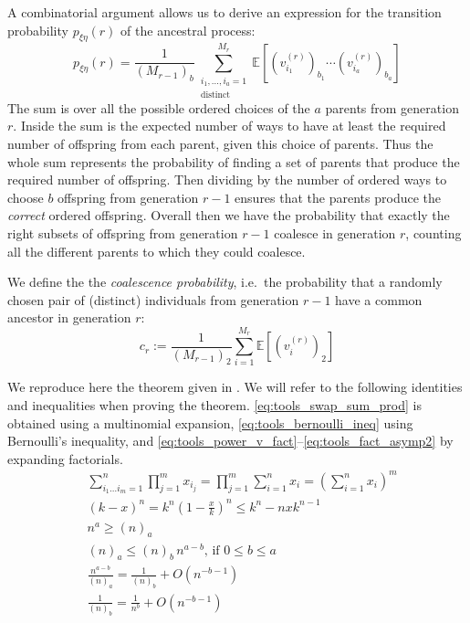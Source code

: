 \documentclass{article}
\newcommand{\E}{\mathbb{E}}
\begin{document}
A combinatorial argument allows us to derive an expression for the transition probability $p_{\xi\eta}(r)$ of the ancestral process:
\begin{equation}\label{eq:trans_prob}
p_{\xi\eta}(r) = \frac{1}{(M_{r-1})_b} \sum_{\substack{i_1,\dots,i_a =1 \\ \text{distinct}}}^{M_r} \E\left[(v_{i_1}^{(r)})_{b_1}\cdots (v_{i_a}^{(r)})_{b_a}\right]
\end{equation}
The sum is over all the possible ordered choices of the $a$ parents from generation $r$. Inside the sum is the expected number of ways to have at least the required number of offspring from each parent, given this choice of parents. Thus the whole sum represents the probability of finding a set of parents that produce the required number of offspring. Then dividing by the number of ordered ways to choose $b$ offspring from generation $r-1$ ensures that the parents produce the \emph{correct} ordered offspring. Overall then we have the probability that exactly the right subsets of offspring from generation $r-1$ coalesce in generation $r$, counting all the different parents to which they could coalesce.

We define the the \emph{coalescence probability}, i.e.\ the probability that a randomly chosen pair of (distinct) individuals from generation $r-1$ have a common ancestor in generation $r$:
\begin{equation}
c_r := \frac{1}{(M_{r-1})_2} \sum_{i=1}^{M_r} \E \left[ (v_i^{(r)})_2 \right] \label{eq:coal_prob1}
\end{equation}

We reproduce here the theorem given in \citep[Theorem 1]{mohle1998}.
We will refer to the following identities and inequalities when proving the theorem. \eqref{eq:tools_swap_sum_prod} is obtained using a multinomial expansion, \eqref{eq:tools_bernoulli_ineq} using Bernoulli's inequality, and \eqref{eq:tools_power_v_fact}--\eqref{eq:tools_fact_asymp2} by expanding factorials. 
\begin{align}
& \sum_{i_1\dots i_m = 1}^n \prod_{j=1}^m x_{i_j} = \prod_{j=1}^m \sum_{i=1}^n x_i = \left( \sum_{i=1}^n x_i \right)^m \label{eq:tools_swap_sum_prod}\\
& (k-x)^n = k^n\left(1-\frac{x}{k}\right)^n \leq k^n - nxk^{n-1} \label{eq:tools_bernoulli_ineq}\\
& n^a \geq (n)_a \label{eq:tools_power_v_fact}\\
& (n)_a \leq (n)_b \,n^{a-b} \text{, if } 0\leq b\leq a \label{eq:tools_fact_taketwo_bd}\\
& \frac{n^{a-b}}{(n)_a} = \frac{1}{(n)_b} + O(n^{-b-1}) \label{eq:tools_fact_asymp1}\\
& \frac{1}{(n)_b} = \frac{1}{n^b} + O(n^{-b-1}) \label{eq:tools_fact_asymp2}
\end{align}
\end{document}
